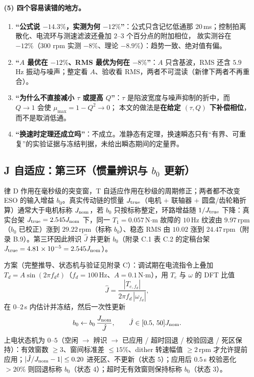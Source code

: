 \documentclass[11pt,a4paper]{article}
\theoremstyle{remark}\newtheorem{remark}{注}
\begin{document}
\paragraph{(5) 四个容易读错的地方。}
\begin{enumerate}
  \item \textbf{“公式说 $-14.3\%$，实测为何 $-12\%$”}：公式只含记忆低通那 $20$\,ms；控制拍离散化、电流环与测速滤波还叠加 $2$--$3$ 个百分点的附加相位，
        故实测谷在 $-12\%$（300 rpm 实测 $-8\%$、理论 $-8.9\%$）：趋势一致、绝对值有偏。
  \item \textbf{“$A$ 最优在 $-12\%$、RMS 最优为何在 $-8\%$”}：$A$ 只含基波，RMS 还含 $5.9$\,Hz 振动与噪声；整定看 $A$、验收看 RMS，两者不可混读（新律下两者不再重合）。
  \item \textbf{“为什么不直接减小 $\tau$ 或提高 $Q$”}：$\tau$ 是陷波宽度与噪声抑制的折中，而 $Q\to1$ 会使 $\mu_{\max}=1-Q^{2}\to0$；
        本文的做法是\textbf{在给定 $(\tau,Q)$ 下补偿相位}，而不是取消低通。
  \item \textbf{“换速时定理还成立吗”}：不成立。准静态有定理，换速瞬态只有“有界、可重复”的实验证据与冻结判据，未给出瞬态期间的定量界。
\end{enumerate}

\subsection{J 自适应：第三环（惯量辨识与 $b_0$ 更新）}\label{sec:jadapt}

律 D 作用在毫秒级的突变窗，T 自适应作用在秒级的周期修正；两者都不改变 ESO 的输入增益 $b_0$。真实传动链的惯量 $J_{\rm true}$（电机 $+$ 联轴器 $+$ 圆盘/齿轮箱折算）通常大于电机标称 $J_{\rm nom}$，若 $b_0$ 只按标称整定，环路增益随 $1/J_{\rm true}$ 下降：真实台架 $J_{\rm true}=2.545J_{\rm nom}$ 下，同一 $T_1=0.057$\,N$\cdot$m 故障的 $10$\,Hz 纹波由 $9.97$\,rpm（$b_0$ 已校正）涨到 $29.22$\,rpm（标称 $b_0$）、稳态 RMS 由 $10.02$ 涨到 $24.47$\,rpm（附录 B.9）。第三环因此辨识 $\hat J$ 并更新 $b_0$（附录 C.1 表 C.2 的定稿台架 $J_{\rm true}=4.81\times10^{-5}=2.545J_{\rm nom}$）。

方案（完整推导、状态机与验证见附录 C）：调试期在电流指令上叠加 $T_d=A\sin(2\pi f_d t)$（$f_d=100$\,Hz、$A=0.1$\,N$\cdot$m），用 $T_e$ 与 $\omega$ 的 DFT 比值
\begin{equation}
\hat J=\frac{|T_{e,f_d}|}{2\pi f_d\,|\omega_{f_d}|},
\label{eq:jhat}
\end{equation}
在 $0$--$2$\,s 内估计并冻结，然后一次性更新
\begin{equation}
b_0\leftarrow b_0\,\frac{J_{\rm nom}}{\hat J},\qquad \hat J\in[0.5,\,50]J_{\rm nom}.
\label{eq:jupdate}
\end{equation}
上电状态机为 $0$--$5$（空闲 $\to$ 辨识 $\to$ 已应用 / 超时回退 / 校验回退 / 死区保持）：有效窗数 $\ge3$、窗间标准差 $\le15\%$、dither 转速幅值 $\ge2$\,rpm 才允许提前应用；$|\hat J/J_{\rm nom}-1|\le0.20$ 进死区、不更新（状态 $5$）；应用后 $0.5$\,s 校验恶化 $>20\%$ 则回退标称 $b_0$（状态 $4$）；超时无有效窗则保持标称 $b_0$（状态 $3$）。
\end{document}
